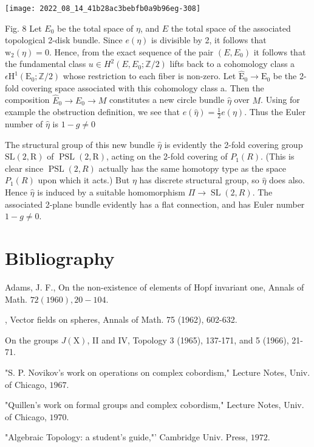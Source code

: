 \documentclass[10pt]{article}
\begin{document}
\texttt{[image: 2022\_08\_14\_41b28ac3bebfb0a9b96eg-308]}

Fig. 8 Let $E_{0}$ be the total space of $\eta$, and $E$ the total space of the associated topological 2-disk bundle. Since $e(\eta)$ is divisible by 2, it follows that $\mathrm{w}_{2}(\eta)=0$. Hence, from the exact sequence of the pair $\left(E, E_{0}\right)$ it follows that the fundamental class $u \in H^{2}\left(E, E_{0} ; \mathbb{Z} / 2\right)$ lifts back to a cohomology class a $\epsilon \mathrm{H}^{1}\left(\mathrm{E}_{0} ; \mathbb{Z} / 2\right)$ whose restriction to each fiber is non-zero. Let $\hat{\mathrm{E}}_{0} \rightarrow \mathrm{E}_{0}$ be the 2-fold covering space associated with this cohomology class a. Then the composition $\widehat{E}_{0} \rightarrow E_{0} \rightarrow M$ constitutes a new circle bundle $\hat{\eta}$ over $M$. Using for example the obstruction definition, we see that $e(\hat{\eta})=\frac{1}{2} e(\eta)$. Thus the Euler number of $\hat{\eta}$ is $1-g \neq 0$

The structural group of this new bundle $\hat{\eta}$ is evidently the 2-fold covering group $\mathrm{SL}(2, \mathrm{R})$ of $\operatorname{PSL}(2, \mathrm{R})$, acting on the 2-fold covering of $P_{1}(R)$. (This is clear since $\operatorname{PSL}(2, R)$ actually has the same homotopy type as the space $P_{1}(R)$ upon which it acts.) But $\eta$ has discrete structural group, so $\hat{\eta}$ does also. Hence $\hat{\eta}$ is induced by a suitable homomorphism $\Pi \rightarrow \operatorname{SL}(2, R)$. The associated 2-plane bundle evidently has a flat connection, and has Euler number $1-g \neq 0$.

\section{Bibliography}
Adams, J. F., On the non-existence of elements of Hopf invariant one, Annals of Math. $72(1960), 20-104$.

, Vector fields on spheres, Annals of Math. 75 (1962), 602-632.

On the groups $J(\mathrm{X})$, II and IV, Topology 3 (1965), 137-171, and 5 (1966), 21-71.

"S. P. Novikov's work on operations on complex cobordism," Lecture Notes, Univ. of Chicago, $1967 .$

"Quillen's work on formal groups and complex cobordism," Lecture Notes, Univ. of Chicago, $1970 .$

"Algebraic Topology: a student's guide,"' Cambridge Univ. Press, $1972 .$
\end{document}
